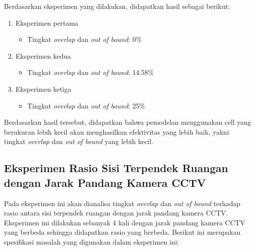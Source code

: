 Berdasarkan eksperimen yang dilakukan, didapatkan hasil sebagai berikut:
\begin{enumerate}
	\item Eksperimen pertama
	\begin{itemize}
		\item Tingkat \textit{overlap} dan \textit{out of bound}: 0\%
	\end{itemize}
	
	\item Eksperimen kedua
	\begin{itemize}
		\item Tingkat \textit{overlap} dan \textit{out of bound}: 14.58\%
	\end{itemize}
	
	\item Eksperimen ketiga
	\begin{itemize}
		\item Tingkat \textit{overlap} dan \textit{out of bound}: 25\%
	\end{itemize}
\end{enumerate}

Berdasarkan hasil tersebut, didapatkan bahwa pemodelan menggunakan cell yang berukuran lebih kecil akan menghasilkan efektivitas yang lebih baik, yakni tingkat \textit{overlap} dan \textit{out of bound} yang lebih kecil.

\subsection{Eksperimen Rasio Sisi Terpendek Ruangan dengan Jarak Pandang Kamera CCTV}
Pada eksperimen ini akan dianalisa tingkat \textit{overlap} dan \textit{out of bound} terhadap rasio antara sisi terpendek ruangan dengan jarak pandang kamera CCTV. Eksperimen ini dilakukan sebanyak 4 kali dengan jarak pandang kamera CCTV yang berbeda sehingga didapatkan rasio yang berbeda. Berikut ini merupakan spesifikasi masalah yang digunakan dalam eksperimen ini:

